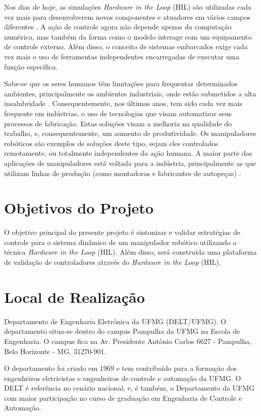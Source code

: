 Nos dias de hoje, as simulações \emph{Hardware in the Loop} (HIL) são utilizadas
cada vez mais para desenvolverem novos componentes e atuadores em vários campos
diferentes \cite{Bouscayrol}. A ação de controle agora não depende 
apenas da computação numérica, mas também da forma como o modelo interage com um 
equipamento de controle externo. Além disso, o conceito de sistemas embarcados 
exige cada vez mais o uso de ferramentas independentes encarregadas de executar 
uma função específica.

Sabe-se que os seres humanos têm limitações para frequentar determinados ambientes, 
principalmente os ambientes industriais, onde estão submetidos a alta insalubridade 
\cite{Lacaz}. Consequentemente, nos últimos anos, tem sido cada vez mais frequente 
em indústrias, o uso de tecnologias que visam automatizar seus processos de 
fabricação. Estas soluções visam a melhoria na qualidade do trabalho, e, 
consequentemente, um aumento de produtividade. Os manipuladores robóticos são 
exemplos de soluções deste tipo, sejam eles controlados remotamente, ou totalmente independentes 
da ação humana. A maior parte das aplicações de manipuladores está voltada para a indústria, 
principalmente as que utilizam linhas de produção (como montadoras e fabricantes de autopeças)
\cite{Spong}.

\section{Objetivos do Projeto}

O objetivo principal do presente projeto é sintonizar e validar estratégias de 
controle para o sistema dinâmico de um manipulador robótico utilizando a técnica 
\emph{Hardware in the Loop} (HIL). Além disso, será construída uma plataforma de 
validação de controladores através do \emph{Hardware in the Loop} (HIL).

\section{Local de Realização}

Departamento de Engenharia Eletrônica da UFMG (DELT/UFMG). O departamento 
situa-se dentro do campus Pampulha da UFMG na Escola de Engenharia. O campus 
fica na Av. Presidente Antônio Carlos 6627 - Pampulha, Belo Horizonte - MG, 
31270-901.

O departamento foi criado em 1969 e tem contribuído para a formação dos 
engenheiros eletricistas e engenheiros de controle e automação da UFMG. O DELT é 
referência no cenário nacional, e, é também, o Departamento da UFMG com maior 
participação no curso de graduação em Engenharia de Controle e Automação.

